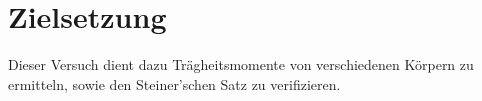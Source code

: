 \section{Zielsetzung}
\label{sec:Zielsetzung}
Dieser Versuch dient dazu Trägheitsmomente von verschiedenen Körpern zu ermitteln,
sowie den Steiner'schen Satz zu verifizieren.
